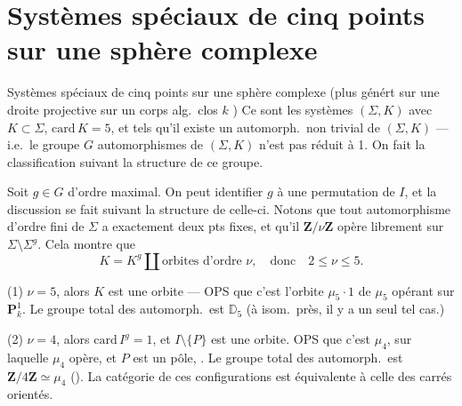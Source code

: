 \documentclass[11pt,a4paper]{article}
\begin{document}
\section{Systèmes spéciaux de cinq points sur une sphère complexe}


Systèmes spéciaux de cinq points sur une sphère complexe (plus
génért sur une  droite projective sur un
corps alg.\ clos $k$ ) Ce sont les systèmes
$(\Sigma, K)$ avec $K \subset \Sigma$, $\mathrm{card}\, K = 5$, et tels
qu'il existe un automorph.\ non trivial de $(\Sigma, K)$ --- i.e.\ le
groupe $G$
automorphismes de $(\Sigma, K)$ n'est pas réduit à 1. On fait la
classification suivant la structure de ce groupe.

Soit $g \in G$ d'ordre maximal. On peut identifier $g$ à une
permutation de $I$, et la
discussion se fait suivant la structure de celle-ci. Notons que
  tout
automorphisme d'ordre fini de $\Sigma$ a exactement deux pts fixes, et
qu'il \struck{\ill{}}   $\mathbf{Z}/\nu\mathbf{Z}$ opère
librement sur $\Sigma \setminus \Sigma^{g}$. Cela montre que
\[
K = K^{g} \amalg \text{orbites d'ordre } \nu, \quad \text{donc}\quad
2 \leqslant \nu \leqslant 5 .
\]

(1) $\nu = 5$, alors $K$ est une orbite --- OPS que c'est l'orbite
$\mu_5 \cdot 1$  de $\mu_5$ opérant sur
$\mathbf{P}^{1}_{k}$. Le groupe total des automorph.\ est
$\mathbb{D}_5$ (à isom.\ près, il y a un seul tel cas.)

(2) $\nu = 4$, alors  $\mathrm{card}\, I^{g} =
1$, et $I
\setminus \lbrace P \rbrace$ est une orbite. OPS que c'est $\mu_4$, sur
laquelle $\mu_4$ opère, et $P$ est un pôle, \uncertain{$\infty$}. Le
groupe total des automorph.\ est $\mathbf{Z}/4\mathbf{Z} \simeq \mu_4$
(\ill{}). La catégorie de ces configurations est équivalente à celle des
carrés orientés.
\end{document}
